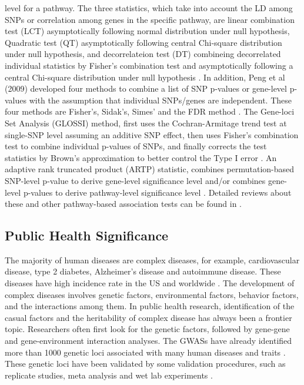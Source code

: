\documentclass[12pt]{article}
\begin{document}
level for a pathway. The three statistics, which take into account the LD among SNPs or correlation among genes in the specific pathway, are linear combination test (LCT) asymptotically following normal distribution under null hypothesis, Quadratic test (QT) asymptotically following central Chi-square distribution under null hypothesis, and decorrelateion test (DT) combineing decorrelated individual statistics by Fisher's combination test and asymptotically following a central Chi-square distribution under null hypothesis \cite{Luo2010}. In addition, Peng et al (2009) developed four methods to combine a list of SNP p-values or gene-level p-values with the assumption that individual SNPs/genes are independent. These four methods are Fisher's, Sidak's, Simes' and the FDR method \cite{peng2009gene}. The Gene-loci Set Analysis (GLOSSI) method, first uses the Cochran-Armitage trend test at single-SNP level assuming an additive SNP effect, then uses Fisher's combination test to combine individual p-values of SNPs, and finally corrects the test statistics by Brown's approximation to better control the Type I error \cite{Chai2009}. An adaptive rank truncated product (ARTP) statistic, combines permutation-based SNP-level p-value to derive gene-level significance level and/or combines gene-level p-values to derive pathway-level significance level \cite{Yu2009}. Detailed reviews about these and other pathway-based association tests can be found in \cite{tintle2011inflated,Wang2010,Fridley2011}. 

\subsection{Public Health Significance}\label{sec:PHsig}
The majority of human diseases are complex diseases, for example, cardiovascular disease, type 2 diabetes, Alzheimer's disease and autoimmune disease. These diseases have high incidence rate in the US and worldwide 
\cite{Craig2008,Inzucchi2012,Go2013,Association2014,Benros2014}. The development of complex diseases involves genetic factors, environmental factors, behavior factors, and the interactions among them. In public health research, identification of the casual factors and the heritability of complex disease has always been a frontier topic. Researchers often first look for the genetic factors, followed by gene-gene and gene-environment interaction analyses.  The GWASs have already identified more than 1000 genetic loci associated with many human diseases and traits \cite{Hindorff2009}. These genetic loci have been validated by some validation procedures, such as replicate studies, meta analysis and wet lab experiments \cite{Wang2005,Hirschhorn2005,McCarthy2008,Hindorff2009,Cantor2010}. 
\end{document}
